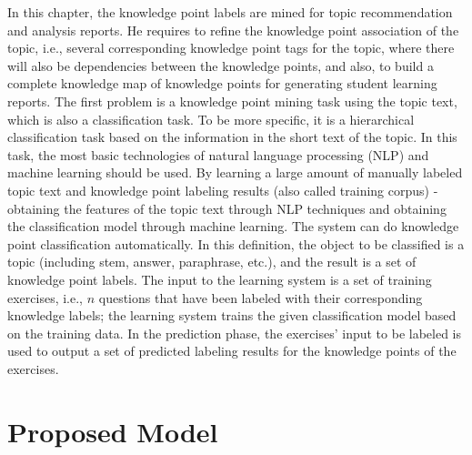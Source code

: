 In this chapter, the knowledge point labels are mined for topic recommendation and analysis reports. He requires to refine the knowledge point association of the topic, i.e., several corresponding knowledge point tags for the topic, where there will also be dependencies between the knowledge points, and also, to build a complete knowledge map of knowledge points for generating student learning reports. The first problem is a knowledge point mining task using the topic text, which is also a classification task. To be more specific, it is a hierarchical classification task based on the information in the short text of the topic. In this task, the most basic technologies of natural language processing (NLP) and machine learning should be used. By learning a large amount of manually labeled topic text and knowledge point labeling results (also called training corpus) - obtaining the features of the topic text through NLP techniques and obtaining the classification model through machine learning. The system can do knowledge point classification automatically. In this definition, the object to be classified is a topic (including stem, answer, paraphrase, etc.), and the result is a set of knowledge point labels. The input to the learning system is a set of training exercises, i.e., \(n\) questions that have been labeled with their corresponding knowledge labels; the learning system trains the given classification model based on the training data. In the prediction phase, the exercises' input to be labeled is used to output a set of predicted labeling results for the knowledge points of the exercises.

\section{Proposed Model}


